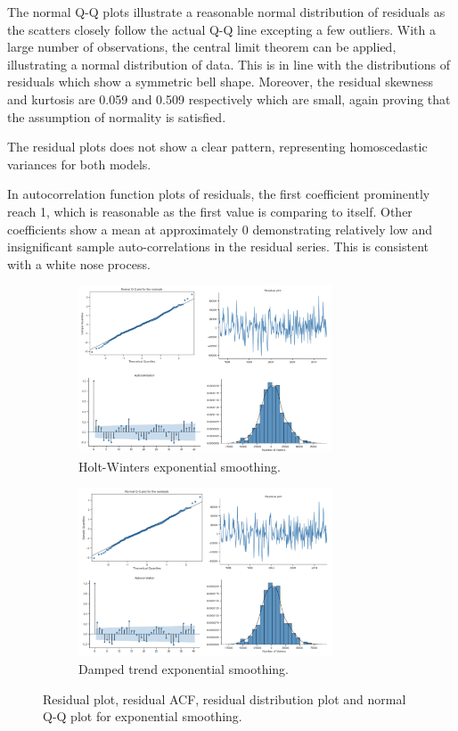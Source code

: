 \documentclass[letterpaper,12pt,twoside,]{pinp}
\begin{document}
The normal Q-Q plots illustrate a reasonable normal distribution of
residuals as the scatters closely follow the actual Q-Q line excepting a
few outliers. With a large number of observations, the central limit
theorem can be applied, illustrating a normal distribution of data. This
is in line with the distributions of residuals which show a symmetric
bell shape. Moreover, the residual skewness and kurtosis are 0.059 and
0.509 respectively which are small, again proving that the assumption of
normality is satisfied.

The residual plots does not show a clear pattern, representing
homoscedastic variances for both models.

In autocorrelation function plots of residuals, the first coefficient
prominently reach 1, which is reasonable as the first value is comparing
to itself. Other coefficients show a mean at approximately 0
demonstrating relatively low and insignificant sample auto-correlations
in the residual series. This is consistent with a white nose process.

\begin{figure}[h]
\begin{subfigure}{0.5\textwidth}
\includegraphics[width=0.9\linewidth, height=5cm]{diagnostic_plot} 
\caption{Holt-Winters exponential smoothing.}
\label{fig:hw_resid}
\end{subfigure}
\begin{subfigure}{0.5\textwidth}
\includegraphics[width=0.9\linewidth, height=5cm]{damped_resid}
\caption{Damped trend exponential smoothing.}
\label{fig:damped_resid}
\end{subfigure}
\caption{Residual plot, residual ACF, residual distribution plot and normal Q-Q plot for exponential smoothing.}
\label{fig:diag}
\end{figure}
\end{document}
